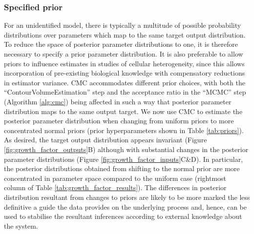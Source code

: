 \subsubsection{Specified prior}
For an unidentified model, there is typically a multitude of possible probability distributions over parameters which map to the same target output distribution. To reduce the space of posterior parameter distributions to one, it is therefore necessary to specify a prior parameter distribution. It is also preferable to allow priors to influence estimates in studies of cellular heterogeneity, since this allows incorporation of pre-existing biological knowledge with compensatory reductions in estimator variance. CMC accommodates different prior choices, with both the ``ContourVolumeEstimation'' step and the acceptance ratio in the ``MCMC'' step (Algorithm \ref{alg:cmc}) being affected in such a way that posterior parameter distribution maps to the same output target. We now use CMC to estimate the posterior parameter distribution when changing from uniform priors to more concentrated normal priors (prior hyperparameters shown in Table \ref{tab:priors}). As desired, the target output distribution appears invariant (Figure \ref{fig:growth_factor_outputs}B) although with substantial changes in the posterior parameter distributions (Figure \ref{fig:growth_factor_inputs}C\&D). In particular, the posterior distributions obtained from shifting to the normal prior are more concentrated in parameter space compared to the uniform case (rightmost column of Table \ref{tab:growth_factor_results}). The differences in posterior distribution resultant from changes to priors are likely to be more marked the less definitive a guide the data provides on the underlying process and, hence, can be used to stabilise the resultant inferences according to external knowledge about the system.

